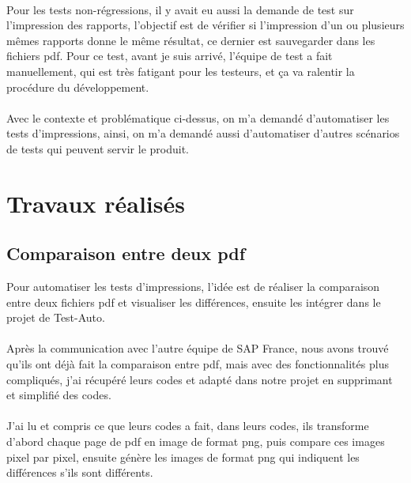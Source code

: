 \documentclass[french]{article}
\begin{document}
	\paragraph*{}
	Pour les tests non-régressions, il y avait eu aussi la demande de test sur l'impression des rapports, l'objectif est de vérifier si l'impression d'un ou plusieurs mêmes rapports donne le même résultat, ce dernier est sauvegarder dans les fichiers pdf. Pour ce test, avant je suis arrivé, l'équipe de test a fait manuellement, qui est très fatigant pour les testeurs, et ça va ralentir la procédure du développement. 
	
	\paragraph*{}
	Avec le contexte et problématique ci-dessus, on m'a demandé d'automatiser les tests d'impressions, ainsi, on m'a demandé aussi d'automatiser d'autres scénarios de tests qui peuvent servir le produit.
	
	\newpage
	\section{Travaux réalisés}	
	\subsection{Comparaison entre deux pdf}
	Pour automatiser les tests d'impressions, l'idée est de réaliser la comparaison entre deux fichiers pdf et visualiser les différences, ensuite les intégrer dans le projet de Test-Auto. 
	
	\paragraph*{}
	Après la communication avec l'autre équipe de SAP France, nous avons trouvé qu'ils ont déjà fait la comparaison entre pdf, mais avec des fonctionnalités plus compliqués, j'ai récupéré leurs codes et adapté dans notre projet en supprimant et simplifié des codes. 
	
	\paragraph*{}
	J'ai lu et compris ce que leurs codes a fait, dans leurs codes, ils transforme d'abord chaque page de pdf en image de format png, puis compare ces images pixel par pixel, ensuite génère les images de format png qui indiquent les différences s'ils sont différents.
	
\end{document}
